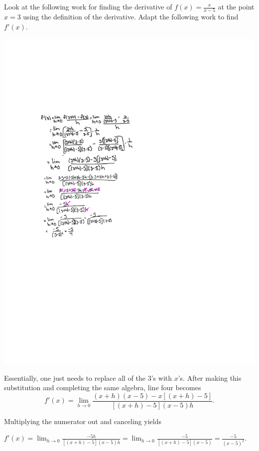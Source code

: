\documentclass[handout,nooutcomes]{ximera}
\begin{document}
\begin{problem}
Look at the following work for finding the derivative of $f(x) = \frac{x}{x-5}$ at the point $x=3$ using the definition of the derivative.  Adapt the following work to find $f'(x)$.  
	\begin{image}
	\includegraphics[trim= 170 310 250 180]{Figure1.pdf}
	\end{image}
			\begin{freeResponse}
			Essentially, one just needs to replace all of the $3$'s with $x$'s.  After making this substitution and completing the same algebra, line four becomes
			$$ f'(x) = \lim_{h \to 0} \frac{(x+h)(x-5) - x[(x+h)-5]}{[(x+h)-5](x-5)h}. $$
			
			Multiplying the numerator out and canceling yields
			
			$ f'(x) = \lim_{h \to 0} \frac{-5h}{[(x+h)-5](x-5)h} 
			= \lim_{h \to 0} \frac{-5}{[(x+h)-5](x-5)}
			= \frac{-5}{(x-5)^2}.$
			\end{freeResponse}
\end{problem}
	
\end{document}
